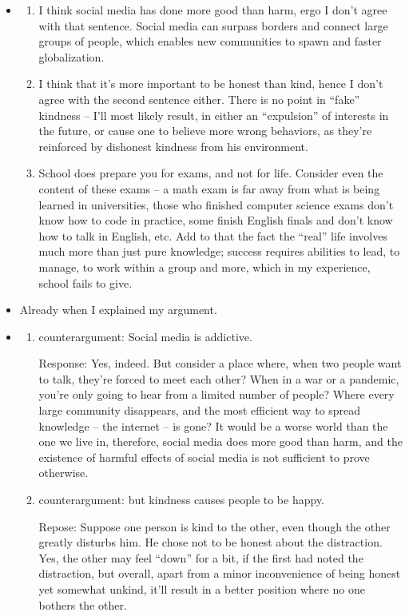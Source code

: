 \documentclass[]{../../../tex/classes/styledArticle}
\begin{document}
	\begin{itemize}
		\item \begin{enumerate}
			\item I think social media has done more good than harm, ergo I don't agree with that sentence. Social media can surpass borders and connect large groups of people, which enables new communities to spawn and faster globalization. 
			\item I think that it's more important to be honest than kind, hence I don't agree with the second sentence either. There is no point in ``fake'' kindness -- I'll most likely result, in either an ``expulsion'' of interests in the future, or cause one to believe more wrong behaviors, as they're reinforced by dishonest kindness from his environment. 
			\item School does prepare you for exams, and not for life. Consider even the content of these exams -- a math exam is far away from what is being learned in universities, those who finished computer science exams don't know how to code in practice, some finish English finals and don't know how to talk in English, etc. Add to that the fact the ``real'' life involves much more than just pure knowledge; success requires abilities to lead, to manage, to work within a group and more, which in my experience, school fails to give. 
		\end{enumerate}
		\item Already when I explained my argument. 
		\item \begin{enumerate}
			\item counterargument: Social media is addictive. 
			
			Response: Yes, indeed. But consider a place where, when two people want to talk, they're forced to meet each other? When in a war or a pandemic, you're only going to hear from a limited number of people? Where every large community disappears, and the most efficient way to spread knowledge -- the internet -- is gone? It would be a worse world than the one we live in, therefore, social media does more good than harm, and the existence of harmful effects of social media is not sufficient to prove otherwise. 
			
			\item counterargument: but kindness causes people to be happy. 
			
			Repose: Suppose one person is kind to the other, even though the other greatly disturbs him. He chose not to be honest about the distraction. Yes, the other may feel ``down'' for a bit, if the first had noted the distraction, but overall, apart from a minor inconvenience of being honest yet somewhat unkind, it'll result in a better position where no one bothers the other. 
			

\end{enumerate}
\end{itemize}
\end{document}
